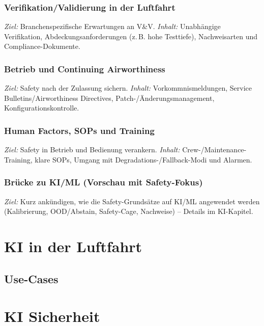\subsection{Verifikation/Validierung in der Luftfahrt}
\textit{Ziel:} Branchenspezifische Erwartungen an V\&V.
\textit{Inhalt:} Unabhängige Verifikation, Abdeckungsanforderungen (z.\,B. hohe Testtiefe), Nachweisarten und Compliance-Dokumente.

\subsection{Betrieb und Continuing Airworthiness}
\textit{Ziel:} Safety nach der Zulassung sichern.
\textit{Inhalt:} Vorkommnismeldungen, Service Bulletins/Airworthiness Directives, Patch-/Änderungsmanagement, Konfigurationskontrolle.

\subsection{Human Factors, SOPs und Training}
\textit{Ziel:} Safety in Betrieb und Bedienung verankern.
\textit{Inhalt:} Crew-/Maintenance-Training, klare SOPs, Umgang mit Degradations-/Fallback-Modi und Alarmen.

\subsection{Brücke zu KI/ML (Vorschau mit Safety-Fokus)}
\textit{Ziel:} Kurz ankündigen, wie die Safety-Grundsätze auf KI/ML angewendet werden (Kalibrierung, OOD/Abstain, Safety-Cage, Nachweise) – Details im KI-Kapitel.











\chapter{KI in der Luftfahrt}
\section{Use-Cases} 











\chapter{KI Sicherheit}
